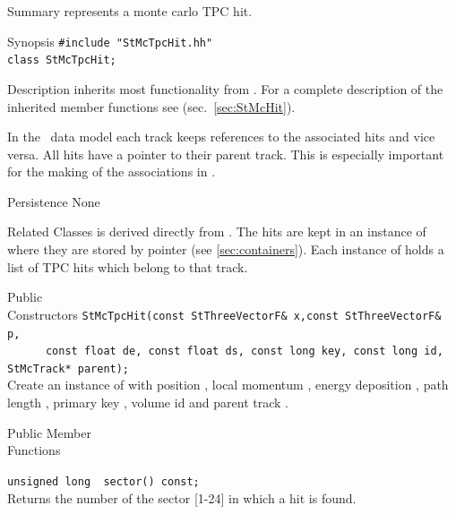 \begin{Entry}
\item[Summary]
     represents a monte carlo TPC hit.

\item[Synopsis]
    \verb+#include "StMcTpcHit.hh"+\\
    \verb+class StMcTpcHit;+\\

\item[Description]
     inherits most functionality from .
    For a complete description of the inherited member functions see
     (sec.~\ref{sec:StMcHit}).

    In the \StMcEvent\ data model each track keeps references to the
    associated hits and vice versa. All hits have a pointer to their
    parent track.  This is especially important for the making of the
    associations in \StAssociationMaker.

\item[Persistence]
    None

\item[Related Classes]
     is derived directly from .
    The hits are kept in an instance of 
    where they are stored by pointer (see \ref{sec:containers}).
    Each instance of  holds a list of TPC hits
    which belong to that track.

\item[Public\\ Constructors]
    \verb+StMcTpcHit(const StThreeVectorF& x,const StThreeVectorF& p,+\\
    \verb+      const float de, const float ds, const long key, const long id, StMcTrack* parent);+\\
    
    Create an instance of  with position , local momentum ,
    energy deposition , path length , primary key ,
    volume id  and parent track . 

\item[Public Member\\ Functions]

    \verb+unsigned long  sector() const;+\\
    Returns the number of the sector [1-24] in which a hit is found. 


\end{Entry}
